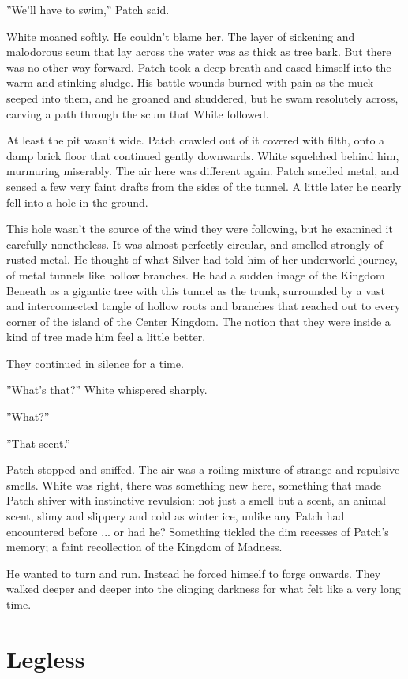 \documentclass[12pt]{book}
\begin{document}
''We'll have to swim,'' Patch said.

White moaned softly. He couldn't blame her. The layer of sickening and malodorous scum that lay across the water was as thick as tree bark. But there was no other way forward. Patch took a deep breath and eased himself into the warm and stinking sludge. His battle-wounds burned with pain as the muck seeped into them, and he groaned and shuddered, but he swam resolutely across, carving a path through the scum that White followed.

At least the pit wasn't wide. Patch crawled out of it covered with filth, onto a damp brick floor that continued gently downwards. White squelched behind him, murmuring miserably. The air here was different again. Patch smelled metal, and sensed a few very faint drafts from the sides of the tunnel. A little later he nearly fell into a hole in the ground.

This hole wasn't the source of the wind they were following, but he examined it carefully nonetheless. It was almost perfectly circular, and smelled strongly of rusted metal. He thought of what Silver had told him of her underworld journey, of metal tunnels like hollow branches. He had a sudden image of the Kingdom Beneath as a gigantic tree with this tunnel as the trunk, surrounded by a vast and interconnected tangle of hollow roots and branches that reached out to every corner of the island of the Center Kingdom. The notion that they were inside a kind of tree made him feel a little better.

They continued in silence for a time.

''What's that?'' White whispered sharply.

''What?''

''That scent.''

Patch stopped and sniffed. The air was a roiling mixture of strange and repulsive smells. White was right, there was something new here, something that made Patch shiver with instinctive revulsion: not just a smell but a scent, an animal scent, slimy and slippery and cold as winter ice, unlike any Patch had encountered before ... or had he? Something tickled the dim recesses of Patch's memory; a faint recollection of the Kingdom of Madness.

He wanted to turn and run. Instead he forced himself to forge onwards. They walked deeper and deeper into the clinging darkness for what felt like a very long time.


\section{Legless}
\end{document}

